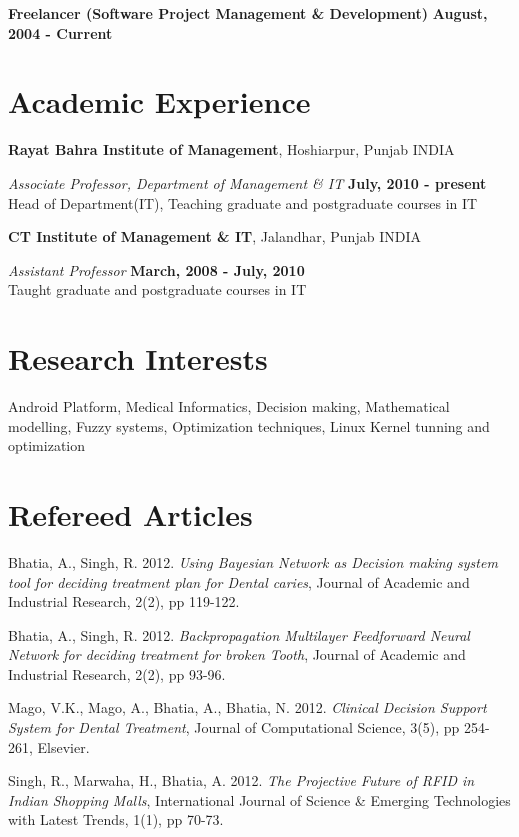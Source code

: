\documentclass[margin,line]{res}
\begin{document}
\begin{resume}
{\bf Freelancer (Software Project Management \& Development)} \hfill {\bf August, 2004 - Current}

\section{\sc Academic Experience}
{\bf Rayat Bahra Institute of Management}, Hoshiarpur, Punjab INDIA

\vspace{-.3cm}
{\em Associate Professor, Department of Management \& IT} \hfill {\bf July, 2010 - present}\\
Head of Department(IT), Teaching graduate and postgraduate courses in IT

{\bf CT Institute of Management \& IT}, Jalandhar, Punjab INDIA

\vspace{-.3cm}
{\em Assistant Professor} \hfill {\bf March, 2008 - July, 2010}\\
Taught graduate and postgraduate courses in IT

\section{\sc Research Interests}
Android Platform, Medical Informatics, Decision making, Mathematical modelling, Fuzzy systems, Optimization techniques, Linux Kernel tunning and optimization

\section{\sc Refereed Articles}

Bhatia, A., Singh, R. 2012. \emph{Using Bayesian Network as Decision making system tool for deciding treatment plan for Dental caries}, Journal of Academic and Industrial Research, 2(2), pp 119-122.

Bhatia, A., Singh, R. 2012. \emph{Backpropagation Multilayer Feedforward Neural Network for deciding treatment for broken Tooth}, Journal of Academic and Industrial Research, 2(2), pp 93-96.

Mago, V.K., Mago, A., Bhatia, A., Bhatia, N. 2012. \emph{Clinical Decision Support System for Dental Treatment},  Journal of Computational Science, 3(5), pp 254-261, Elsevier.

Singh, R., Marwaha, H., Bhatia, A. 2012. \emph{The Projective Future of RFID in Indian Shopping Malls}, International Journal of Science \& Emerging Technologies with Latest Trends, 1(1), pp 70-73. 


\end{resume}
\end{document}
